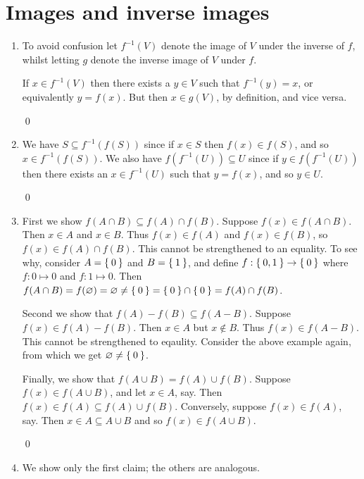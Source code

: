 \section{Images and inverse images}
\begin{enumerate}[Ex. 3.4.1.]
    \item To avoid confusion let $f^{-1}(V)$ denote the image of $V$ under the
    inverse of $f$, whilst letting $g$ denote the inverse image of $V$ under $f$.

    If $x\in f^{-1}(V)$ then there exists a $y\in V$ such that $f^{-1}(y) = x$,
    or equivalently $y = f(x)$. But then $x\in g(V)$, by definition, and vice versa.

    \qed

    \item We have $S \subseteq f^{-1}(f(S))$ since if $x\in S$ then $f(x)\in f(S)$,
    and so $x\in f^{-1}(f(S))$. We also have $f(f^{-1}(U)) \subseteq U$ since if
    $y \in f(f^{-1}(U))$ then there exists an $x \in f^{-1}(U)$ such that $y = f(x)$,
    and so $y \in U$.

    \qed

    \item First we show $f(A \cap B) \subseteq f(A) \cap f(B)$. Suppose
    $f(x)\in f(A\cap B)$. Then $x\in A$ and $x\in B$. Thus $f(x)\in f(A)$
    and $f(x)\in f(B)$, so $f(x)\in f(A) \cap f(B)$. This cannot be strengthened
    to an equality. To see why, consider $A = \Set{0}$ and $B=\Set{1}$, and define
    $f : \Set{0,1}\to \Set{0}$ where $f : 0 \mapsto 0$ and $f : 1\mapsto 0$. Then
    $f(A\cap B) = f(\varnothing) = \varnothing \neq \Set{0} = \Set{0} \cap \Set{0}
    = f(A) \cap f(B)$.

    Second we show that $f(A) - f(B) \subseteq f(A - B)$. Suppose $f(x) \in f(A)
    - f(B)$. Then $x\in A$ but $x \not\in B$. Thus $f(x) \in f(A - B)$. This
    cannot be strengthened to eqaulity. Consider the above example again, from
    which we get $\varnothing \neq \Set{0}$.

    Finally, we show that $f(A\cup B) = f(A) \cup f(B)$. Suppose $f(x)\in f(A\cup B)$,
    and let $x \in A$, say. Then $f(x) \in f(A)\subseteq f(A)\cup f(B)$.
    Conversely, suppose $f(x)\in f(A)$, say. Then $x\in A \subseteq A \cup B$ and
    so $f(x)\in f(A\cup B)$.

    \qed

    \item We show only the first claim; the others are analogous.


\end{enumerate}
